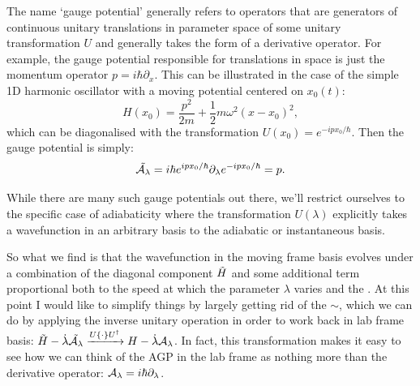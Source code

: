    The name `gauge potential' generally refers to operators that are generators of continuous unitary translations in parameter space \cite{kolodrubetz_geometry_2017} of some unitary transformation $U$ and generally takes the form of a derivative operator. For example, the gauge potential responsible for translations in space is just the momentum operator $p = i\hbar \partial_x$. This can be illustrated in the case of the simple 1D harmonic oscillator with a moving potential centered on $x_0(t)$:
    \begin{equation}\label{eq:harmonic_oscillator}
        H(x_0) = \frac{p^2}{2m} + \frac{1}{2}m \omega^2 (x - x_0)^2,
    \end{equation}
    which can be diagonalised with the transformation $U(x_0) = e^{-i p x_0/\hbar}$. Then the gauge potential is simply:
    \begin{equation}
        \Tilde{\mathcal{A}_{\lambda}} = i\hbar e^{i p x_0/\hbar} \partial_{\lambda} e^{-i p x_0/\hbar} = p.
    \end{equation}
    
    While there are many such gauge potentials out there, we'll restrict ourselves to the specific case of adiabaticity where the transformation $U(\lambda)$ explicitly takes a wavefunction in an arbitrary basis to the adiabatic or instantaneous basis. 
    
    So what we find is that the wavefunction in the moving frame basis evolves under a combination of the diagonal component $\Tilde{H}$ and some additional term proportional both to the speed at which the parameter $\lambda$ varies and the . At this point I would like to simplify things by largely getting rid of the $\sim$, which we can do by applying the inverse unitary operation in order to work back in lab frame basis: $\Tilde{H} - \dot{\lambda}\Tilde{\mathcal{A}_{\lambda}} \xrightarrow{U \{ \cdot \} U^{\dagger}} H - \dot{\lambda} \mathcal{A}_{\lambda}$. In fact, this transformation makes it easy to see how we can think of the AGP in the lab frame as nothing more than the derivative operator: $\mathcal{A}_{\lambda} = i\hbar\partial_{\lambda}$. 

